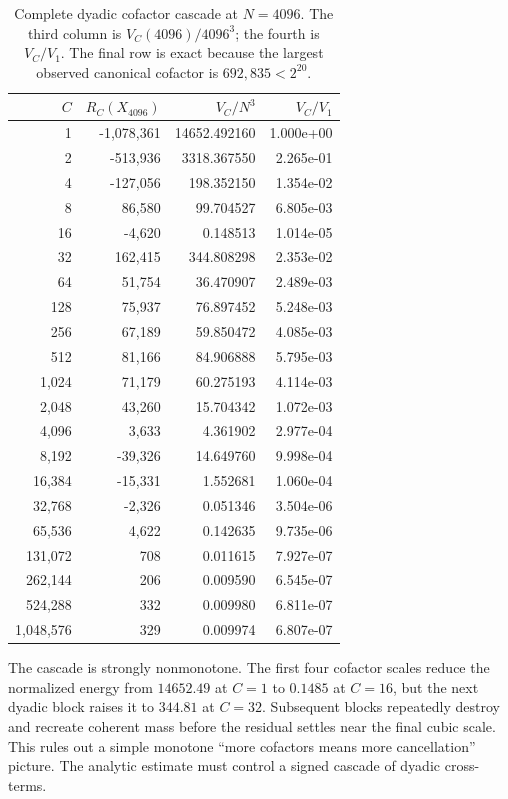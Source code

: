 \documentclass[11pt]{article}
\theoremstyle{definition}
\theoremstyle{remark}
\newcommand{\1}{\mathbf{1}}
\begin{document}
\begin{table}[htbp]
\centering
\caption{Complete dyadic cofactor cascade at $N=4096$.  The third
column is $V_C(4096)/4096^3$; the fourth is $V_C/V_1$.  The final row is
exact because the largest observed canonical cofactor is
$692{,}835<2^{20}$.}
\label{tab:cofactor-cascade}
\scriptsize
\setlength{\tabcolsep}{7pt}
\begin{tabular}{rrrr}
\toprule
$C$ & $R_C(X_{4096})$ & $V_C/N^3$ & $V_C/V_1$\\
\midrule
1 & -1,078,361 & 14652.492160 & 1.000e+00 \\
2 & -513,936 & 3318.367550 & 2.265e-01 \\
4 & -127,056 & 198.352150 & 1.354e-02 \\
8 & 86,580 & 99.704527 & 6.805e-03 \\
16 & -4,620 & 0.148513 & 1.014e-05 \\
32 & 162,415 & 344.808298 & 2.353e-02 \\
64 & 51,754 & 36.470907 & 2.489e-03 \\
128 & 75,937 & 76.897452 & 5.248e-03 \\
256 & 67,189 & 59.850472 & 4.085e-03 \\
512 & 81,166 & 84.906888 & 5.795e-03 \\
1,024 & 71,179 & 60.275193 & 4.114e-03 \\
2,048 & 43,260 & 15.704342 & 1.072e-03 \\
4,096 & 3,633 & 4.361902 & 2.977e-04 \\
8,192 & -39,326 & 14.649760 & 9.998e-04 \\
16,384 & -15,331 & 1.552681 & 1.060e-04 \\
32,768 & -2,326 & 0.051346 & 3.504e-06 \\
65,536 & 4,622 & 0.142635 & 9.735e-06 \\
131,072 & 708 & 0.011615 & 7.927e-07 \\
262,144 & 206 & 0.009590 & 6.545e-07 \\
524,288 & 332 & 0.009980 & 6.811e-07 \\
1,048,576 & 329 & 0.009974 & 6.807e-07 \\
\bottomrule
\end{tabular}
\end{table}

The cascade is strongly nonmonotone.  The first four cofactor scales
reduce the normalized energy from $14652.49$ at $C=1$ to $0.1485$ at
$C=16$, but the next dyadic block raises it to $344.81$ at $C=32$.
Subsequent blocks repeatedly destroy and recreate coherent mass before
the residual settles near the final cubic scale.  This rules out a
simple monotone ``more cofactors means more cancellation'' picture.
The analytic estimate must control a signed cascade of dyadic
cross-terms.
\end{document}
